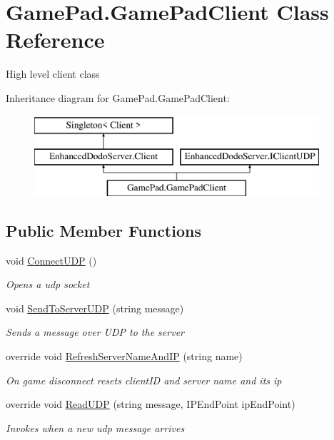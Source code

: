 \hypertarget{class_game_pad_1_1_game_pad_client}{}\section{Game\+Pad.\+Game\+Pad\+Client Class Reference}
\label{class_game_pad_1_1_game_pad_client}


High level client class  


Inheritance diagram for Game\+Pad.\+Game\+Pad\+Client\+:\begin{figure}[H]
\begin{center}
\leavevmode
\includegraphics[height=3.000000cm]{class_game_pad_1_1_game_pad_client}
\end{center}
\end{figure}
\subsection*{Public Member Functions}
\begin{DoxyCompactItemize}
\item 
void \mbox{\hyperlink{class_game_pad_1_1_game_pad_client_ac0cca46c6a1d0fa5e6f83729bcd248f6}{Connect\+U\+DP}} ()
\begin{DoxyCompactList}\small\item\em Opens a udp socket \end{DoxyCompactList}\item 
void \mbox{\hyperlink{class_game_pad_1_1_game_pad_client_ab04a4ee4e0b53ed67a210a62b7eddeba}{Send\+To\+Server\+U\+DP}} (string message)
\begin{DoxyCompactList}\small\item\em Sends a message over U\+DP to the server \end{DoxyCompactList}\item 
override void \mbox{\hyperlink{class_game_pad_1_1_game_pad_client_afca4e18b9b18482ce56f82e7f1fdd639}{Refresh\+Server\+Name\+And\+IP}} (string name)
\begin{DoxyCompactList}\small\item\em On game disconnect resets client\+ID and server name and its ip \end{DoxyCompactList}\item 
override void \mbox{\hyperlink{class_game_pad_1_1_game_pad_client_a73e8617c4d3db915a54b5daefd7928af}{Read\+U\+DP}} (string message, I\+P\+End\+Point ip\+End\+Point)
\begin{DoxyCompactList}\small\item\em Invokes when a new udp message arrives \end{DoxyCompactList}\end{DoxyCompactItemize}
